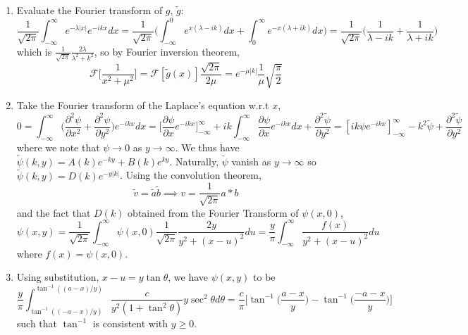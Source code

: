 \documentclass[a4paper]{article}
\begin{document}
\begin{ans}\leavevmode
\begin{enumerate}[label=(\alph*)]
\item Evaluate the Fourier transform of $g$, $\tilde{g}$:
$$\frac{1}{\sqrt{2\pi}}\int_{-\infty}^\infty e^{-\lambda|x|}e^{-ikx}dx=\frac{1}{\sqrt{2\pi}}\bigg(\int_{-\infty}^0e^{x(\lambda-ik)}dx+\int_0^\infty e^{-x(\lambda+ik)}dx\bigg)=\frac{1}{\sqrt{2\pi}}\bigg(\frac{1}{\lambda-ik}+\frac{1}{\lambda+ik}\bigg)$$
which is $\frac{1}{\sqrt{2\pi}}\frac{2\lambda}{\lambda^2+k^2}$, so by Fourier inversion theorem,
$$\mathcal{F}\bigg[\frac{1}{x^2+\mu^2}\bigg]=\mathcal{F}[\tilde{g}(x)]\frac{\sqrt{2\pi}}{2\mu}=e^{-\mu|k|}\frac{1}{\mu}\sqrt{\frac{\pi}{2}}$$
\item  Take the Fourier transform of the Laplace's equation w.r.t $x$,
$$0=\int_{-\infty}^\infty\bigg(\frac{\partial^2\psi}{\partial x^2}+\frac{\partial^2\psi}{\partial y^2}\bigg)e^{-ikx}dx=\bigg[\frac{\partial\psi}{\partial x}e^{-ikx}\bigg]^\infty_{-\infty}+ik\int_{-\infty}^\infty\frac{\partial\psi}{\partial x}e^{-ikx}dx+\frac{\partial^2\tilde{\psi}}{\partial y^2}=[ik\psi e^{-ikx}]^\infty_{-\infty}-k^2\tilde{\psi}+\frac{\partial^2\tilde{\psi}}{\partial y^2}$$
where we note that $\psi\rightarrow 0$ as $y\rightarrow\infty$. We thus have $\tilde{\psi}(k,y)=A(k)e^{-ky}+B(k)e^{ky}$. Naturally, $\tilde{\psi}$ vanish as $y\rightarrow\infty$ so $\tilde{\psi}(k,y)=D(k)e^{-y|k|}$. Using the convolution theorem,  $$\tilde{v}=\tilde{a}\tilde{b}\implies v=\frac{1}{\sqrt{2\pi}}a*b$$ and the fact that $D(k)$ obtained from the Fourier Transform of $\psi(x,0)$, 
$$\psi(x,y)=\frac{1}{\sqrt{2\pi}}\int_{-\infty}^\infty\psi(x,0)\frac{1}{\sqrt{2\pi}}\frac{2y}{y^2+(x-u)^2}du=\frac{y}{\pi}\int_{-\infty}^\infty\frac{f(x)}{y^2+(x-u)^2}du$$
where $f(x)=\psi(x,0)$.
\item Using substitution, $x-u=y\tan\theta$, we have $\psi(x,y)$ to be
$$\frac{y}{\pi}\int_{\tan^{-1}((-a-x)/y)}^{\tan^{-1}((a-x)/y)}\frac{c}{y^2(1+\tan^2\theta)}y\sec^2\theta d\theta=\frac{c}{\pi}\bigg[\tan^{-1}\bigg(\frac{a-x}{y}\bigg)-\tan^{-1}\bigg(\frac{-a-x}{y}\bigg)\bigg]$$
such that $\tan^{-1}$ is consistent with $y\geq0$.
\end{enumerate}
\end{ans}
\newpage
\end{document}
